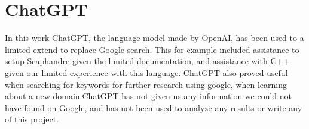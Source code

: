 \section{ChatGPT}\label{app:chat-gpt}

In this work ChatGPT, the language model made by OpenAI, has been used to a limited extend to replace Google search. This for example included assistance to setup Scaphandre given the limited documentation, and assistance with C++ given our limited experience with this language. ChatGPT also proved useful when searching for keywords for further research using google, when learning about a new domain.ChatGPT has not given us any information we could not have found on Google, and has not been used to analyze any results or write any of this project.
